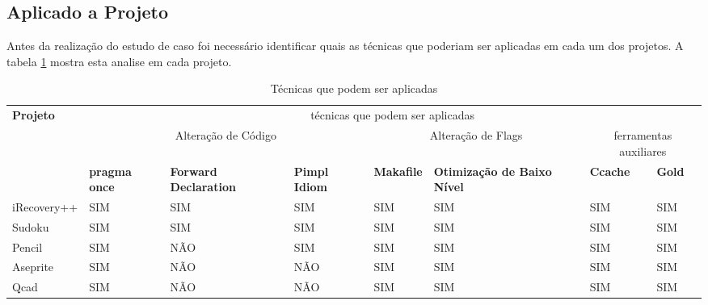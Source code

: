 \subsection{Aplicado a Projeto}

Antes da realização do estudo de caso foi necessário identificar quais
 as técnicas que poderiam ser aplicadas em cada um dos projetos.
 A tabela \ref{tecnicas_que_podem_ser_aplicadas} mostra esta analise em cada projeto.


\begin{table}[h]
\tiny
\begin{tabular}{p{1cm}p{2cm}p{2cm}p{2cm}p{2cm}p{2cm}p{2cm}p{2cm}}
\toprule
\textbf{Projeto} & \multicolumn{7}{c}{técnicas que podem ser aplicadas} \\ 
 & \multicolumn{3}{c}{Alteração de Código} & \multicolumn{2}{c}{Alteração de Flags} & \multicolumn{2}{c}{ferramentas auxiliares}  \\ \midrule 
& \textbf{pragma once} & \textbf{Forward Declaration} & \textbf{Pimpl Idiom} & \textbf{Makafile} &
 \textbf{Otimização de Baixo Nível} & \textbf{Ccache} & \textbf{Gold} \\ \midrule
iRecovery++ & SIM & SIM & SIM &  SIM & SIM & SIM & SIM \\ \midrule
Sudoku &  SIM & SIM & SIM & SIM & SIM & SIM & SIM \\ \midrule
Pencil & SIM & NÃO &  SIM & SIM & SIM & SIM & SIM \\ \midrule
Aseprite &  SIM & NÃO & NÃO & SIM & SIM & SIM & SIM \\ \midrule
Qcad &  SIM & NÃO & NÃO & SIM & SIM & SIM & SIM \\ \bottomrule
\end{tabular} 
\caption{Técnicas que podem ser aplicadas}
\label{tecnicas_que_podem_ser_aplicadas}
\end{table}

